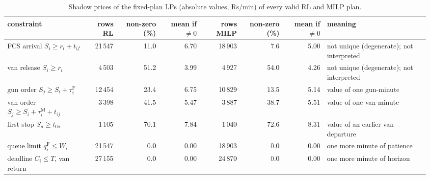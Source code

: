 \begin{table}[H]\centering
\footnotesize
\caption{Shadow prices of the fixed-plan LPs (absolute values, Rs/min) of every valid RL and MILP plan.}\label{tab:duals}
\begin{adjustbox}{max width=\textwidth}\begin{tabular}{lrrrrrrp{3.2cm}}\toprule
constraint & rows RL & non-zero (\%) & mean if $\neq0$ & rows MILP & non-zero (\%) & mean if $\neq0$ & meaning \\ \midrule
FCS arrival $S_i\ge r_i+t_{if}$ & 21\,547 & 11.0 & 6.70 & 18\,903 & 7.6 & 5.00 & not unique (degenerate); not interpreted \\
van release $S_i\ge r_i$ & 4\,503 & 51.2 & 3.99 & 4\,927 & 54.0 & 4.26 & not unique (degenerate); not interpreted \\
gun order $S_j\ge S_i+\tau^{\mathrm F}_i$ & 12\,454 & 23.4 & 6.75 & 10\,829 & 13.5 & 5.14 & value of one gun-minute \\
van order $S_j\ge S_i+\tau^{\mathrm M}_i+t_{ij}$ & 3\,398 & 41.5 & 5.47 & 3\,887 & 38.7 & 5.51 & value of one van-minute \\
first stop $S_a\ge t_{0a}$ & 1\,105 & 70.1 & 7.84 & 1\,040 & 72.6 & 8.31 & value of an earlier van departure \\
queue limit $q^{\mathrm F}_i\le W_i$ & 21\,547 & 0.0 & 0.00 & 18\,903 & 0.0 & 0.00 & one more minute of patience \\
deadline $C_i\le T$, van return & 27\,155 & 0.0 & 0.00 & 24\,870 & 0.0 & 0.00 & one more minute of horizon \\
\bottomrule\end{tabular}\end{adjustbox}\end{table}
